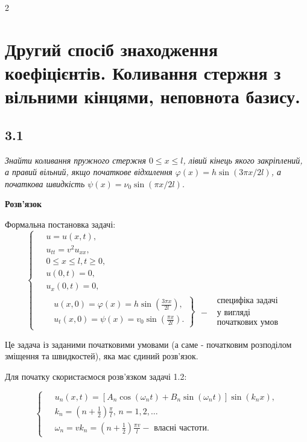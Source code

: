 \documentclass[a4paper, 14pt]{extreport}
\begin{document}
\setcounter{chapter} {2}
\chapter{Другий спосіб знаходження коефіцієнтів. Коливання стержня з вільними кінцями, неповнота базису.}

\section[Задача №3.1]{3.1}

\textit{Знайти коливання пружного стержня $0 \leq x \leq l$, лівий кінець якого закріплений, а правий вільний, якщо початкове відхилення $\varphi(x) = h \sin(3\pi x/2l)$, а початкова швидкість $\psi(x) = \nu_0 \sin(\pi x/2l)$.}

\begin{center}
    \textbf{Розв'язок}
\end{center}
Формальна постановка задачі:
\begin{equation} \label{probcond4}
    \left\{ \begin{aligned} %
        &\;u = u(x,t), \\
        &\;u_{tt} = v^2 u_{xx}, \\
        &\;0 \leq x \leq l, t \geq 0, \\
        &\;u(0,t) = 0,\\
        &\;u_x(0,t) = 0,\\
        &\left.\begin{aligned}
            &u(x,0) = \varphi(x) = h \sin \left(\frac{3 \pi x}{2 l} \right), \\ 
            &u_t(x,0) = \psi(x) = v_0 \sin \left(\frac{\pi x}{2 l}\right).
        \end{aligned}\right\} \; 
        \begin{aligned}
            &\text{ специфіка задачі} \\
          - &\text{ у вигляді } \\
            &\text{ початкових умов } 
        \end{aligned}
    \end{aligned} \right.
\end{equation}

Це задача із заданими початковими умовами (а саме - початковим розподілом зміщення та швидкостей), яка має єдиний розв'язок.

Для початку скористаємося розв'язком задачі 1.2:

\begin{equation}
    \left\{ \begin{aligned} \label{fullsol}
        \;&u_n(x,t) = \left[A_n\cos(\omega_n t) + B_n\sin(\omega_n t)\right] \sin(k_n x), \\
        &k_n = (n + \frac{1}{2})\frac{\pi}{l}, \, n = 1, 2,\ldots\\
        &\omega_n = vk_n = (n + \frac{1}{2})\frac{\pi v}{l} - \text{ власні частоти}.
    \end{aligned}\right.
\end{equation}
\end{document}
